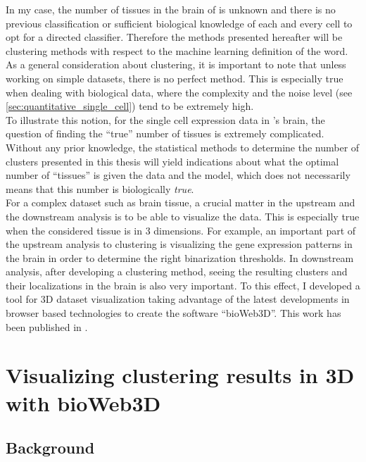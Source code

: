	In my case, the number of tissues in the brain of \platy{} is unknown and there is no previous classification or sufficient biological knowledge of each and every cell to opt for a directed classifier. Therefore the methods presented hereafter will be clustering methods with respect to the machine learning definition of the word.\\
	
	As a general consideration about clustering, it is important to note that unless working on simple datasets, there is no perfect method. This is especially true when dealing with biological data, where the complexity and the noise level (see \ref{sec:quantitative_single_cell}) tend to be extremely high. \\
	
	To illustrate this notion, for the single cell expression data in \platy{}'s brain, the question of finding the ``true'' number of tissues is extremely complicated. Without any prior knowledge, the statistical methods to determine the number of clusters presented in this thesis will yield indications about what the optimal number of ``tissues'' is given the data and the model, which does not necessarily means that this number is biologically \emph{true}.\\
	
	For a complex dataset such as brain tissue, a crucial matter in the upstream and the downstream analysis is to be able to visualize the data. This is especially true when the considered tissue is in 3 dimensions. For example, an important part of the upstream analysis to clustering is visualizing the gene expression patterns in the brain in order to determine the right binarization thresholds. In downstream analysis, after developing a clustering method, seeing the resulting clusters and their localizations in the brain is also very important. To this effect, I developed a tool for 3D dataset visualization taking advantage of the latest developments in browser based technologies to create the software ``bioWeb3D''. This work has been published in \citep{Pettit13}.
	
	

\section{Visualizing clustering results in 3D with bioWeb3D}
	\subsection{Background}

